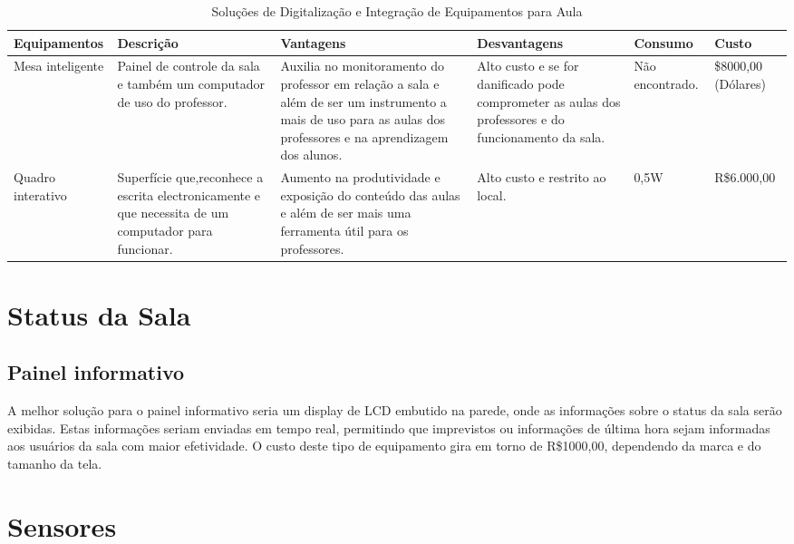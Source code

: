 \begin{table}[!h]
  \centering
  \caption{Soluções de Digitalização e Integração de Equipamentos para Aula}
  \label{my-label}
  \begin{tabular}{|l|l|l|l|l|l|}
    \hline
    \textbf{Equipamentos} & \textbf{Descrição} & \textbf{Vantagens} & \textbf{Desvantagens} & \textbf{Consumo} & \textbf{Custo} \\ \hline
    \parbox[t]{3cm}{Mesa inteligente} & \parbox[t]{2cm}{Painel de controle da sala e também um computador de uso do professor}. & \parbox[t]{3cm}{Auxilia no monitoramento do professor em relação a sala e além de ser um instrumento a mais de uso para as aulas dos professores e na aprendizagem dos alunos.} & \parbox[t]{3cm}{Alto custo e se for danificado pode comprometer as aulas dos professores e do funcionamento da sala.} & \parbox[t]{2cm}{Não encontrado.} & \parbox[t]{2cm}{\$8000,00 (Dólares)} \\ \hline
    \parbox[t]{3cm}{Quadro interativo} & \parbox[t]{2cm}{Superfície que,reconhece a escrita electronicamente e que necessita de um computador para funcionar.} & \parbox[t]{3cm}{Aumento na produtividade e exposição do conteúdo das aulas e além de ser mais uma ferramenta útil para os professores.} & \parbox[t]{3cm}{Alto custo e restrito ao local.} & \parbox[t]{2cm}{0,5W} & \parbox[t]{2cm}{R\$6.000,00} \\ \hline
  \end{tabular}
\end{table}

\section{Status da Sala}

\subsection{Painel informativo}

A melhor solução para o painel informativo seria um display de LCD embutido na parede, onde as informações sobre o status da sala serão exibidas. Estas informações seriam enviadas em tempo real, permitindo que imprevistos ou informações de última hora sejam informadas aos usuários da sala com maior efetividade. O custo deste tipo de equipamento gira em torno de R\$1000,00, dependendo da marca e do tamanho da tela.
\section{Sensores}

